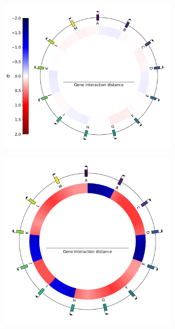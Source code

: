 \begin{figure}[H]
  \centering
  \begin{subfigure}[t]{0.28\textwidth}
    \includegraphics[width=\textwidth]{alife/img/13genes_genome_3.pdf}
    \label{subfig:alife:genome_3}
  \end{subfigure}
  \hspace{-3mm}
  \begin{subfigure}[t]{0.24\textwidth}
    \includegraphics[width=\textwidth]{alife/img/13genes_genome_2.pdf}

\end{subfigure}
\end{figure}
